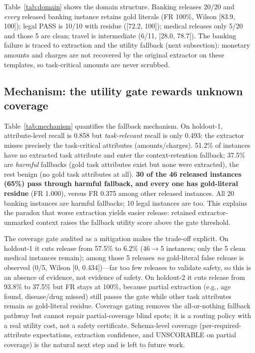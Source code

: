\documentclass[journal]{IEEEtran}
\begin{document}
Table~\ref{tab:domain} shows the domain structure. Banking releases 20/20 and \emph{every} released banking instance retains gold literals (FR 100\%, Wilson [83.9, 100]); legal PASS is 10/10 with residue ([72.2, 100]); medical releases only 5/20 and those 5 are clean; travel is intermediate (6/11, [28.0, 78.7]). The banking failure is traced to extraction and the utility fallback (next subsection): monetary amounts and charges are not recovered by the original extractor on these templates, so task-critical amounts are never scrubbed.

\subsection{Mechanism: the utility gate rewards unknown coverage}\label{sec:res-mech}
Table~\ref{tab:mechanism} quantifies the fallback mechanism. On holdout-1, attribute-level recall is 0.858 but \emph{task-relevant} recall is only 0.493: the extractor misses precisely the task-critical attributes (amounts/charges). 51.2\% of instances have no extracted task attribute and enter the context-retention fallback; 37.5\% are \emph{harmful} fallbacks (gold task attributes exist but none were extracted), the rest benign (no gold task attributes at all). \textbf{30 of the 46 released instances (65\%) pass through harmful fallback, and every one has gold-literal residue} (FR 1.000), versus FR 0.375 among other released instances. All 20 banking instances are harmful fallbacks; 10 legal instances are too. This explains the paradox that worse extraction yields easier release: retained extractor-unmarked context raises the fallback utility score above the gate threshold.

The coverage gate audited as a mitigation makes the trade-off explicit. On holdout-1 it cuts release from 57.5\% to 6.2\% (46$\to$5 instances; only the 5 clean medical instances remain); among those 5 releases \emph{no} gold-literal false release is observed (0/5, Wilson [0, 0.434])---far too few releases to validate safety, so this is an absence of evidence, not evidence of safety. On holdout-2 it cuts release from 93.8\% to 37.5\% but FR stays at 100\%, because partial extraction (e.g., age found, disease/drug missed) still passes the gate while other task attributes remain as gold-literal residue. Coverage gating removes the all-or-nothing fallback pathway but cannot repair partial-coverage blind spots; it is a routing policy with a real utility cost, not a safety certificate. Schema-level coverage (per-required-attribute expectations, extraction confidence, and UNSCORABLE on partial coverage) is the natural next step and is left to future work.
\end{document}
